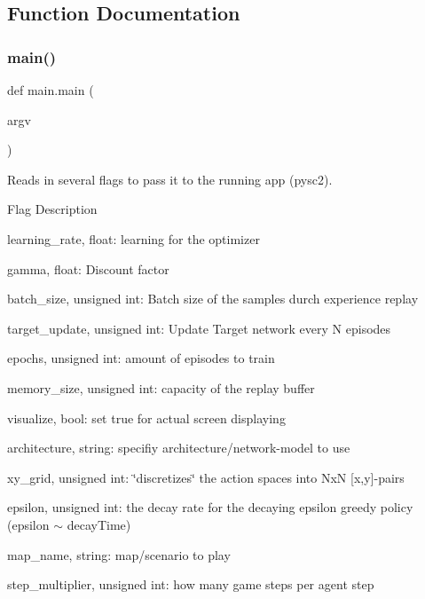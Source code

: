\subsection{Function Documentation}
\mbox{\label{namespacemain_af3f5f1d2e9b06bf119f500dced42f536}} 
\subsubsection{\texorpdfstring{main()}{main()}}
{\footnotesize\ttfamily def main.\+main (\begin{DoxyParamCaption}\item[{}]{argv }\end{DoxyParamCaption})}



Reads in several flags to pass it to the running app (pysc2). 

Flag Description
\begin{DoxyItemize}
\item learning\+\_\+rate, float\+: learning for the optimizer
\item gamma, float\+: Discount factor
\item batch\+\_\+size, unsigned int\+: Batch size of the samples durch experience replay
\item target\+\_\+update, unsigned int\+: Update Target network every N episodes
\item epochs, unsigned int\+: amount of episodes to train
\item memory\+\_\+size, unsigned int\+: capacity of the replay buffer
\item visualize, bool\+: set true for actual screen displaying
\item architecture, string\+: specifiy architecture/network-\/model to use
\item xy\+\_\+grid, unsigned int\+: \char`\"{}discretizes\char`\"{} the action spaces into NxN \mbox{[}x,y\mbox{]}-\/pairs
\item epsilon, unsigned int\+: the decay rate for the decaying epsilon greedy policy (epsilon $\sim$ decay\+Time)
\item map\+\_\+name, string\+: map/scenario to play
\item step\+\_\+multiplier, unsigned int\+: how many game steps per agent step 
\end{DoxyItemize}